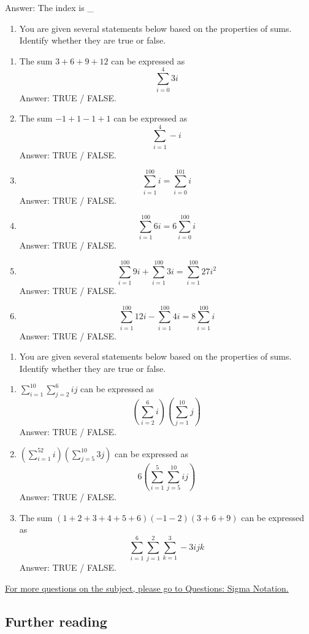 \documentclass[
  12pt,
  a4paper, oneside]{starmastarticle}
\providecommand{\tightlist}{%
  \setlength{\itemsep}{0pt}\setlength{\parskip}{0pt}}\usepackage{longtable,booktabs,array}
\begin{document}
Answer: The index is \_

\begin{enumerate}
\def\labelenumi{\arabic{enumi}.}
\setcounter{enumi}{2}
\tightlist
\item
  You are given several statements below based on the properties of
  sums. Identify whether they are true or false.
\end{enumerate}

\begin{enumerate}
\def\labelenumi{(\alph{enumi})}
\item
  The sum \(3 + 6 + 9 + 12\) can be expressed as \[\sum_{i = 0}^{4} 3i\]
  Answer: TRUE / FALSE.
\item
  The sum \(-1 + 1 - 1 + 1\) can be expressed as \[\sum_{i = 1}^{4} -i\]
  Answer: TRUE / FALSE.
\item
  \[\sum_{i = 1}^{100} i = \sum_{i = 0}^{101} i\] Answer: TRUE / FALSE.
\item
  \[\sum_{i = 1}^{100} 6i = 6 \sum_{i = 0}^{100} i\] Answer: TRUE /
  FALSE.
\item
  \[\sum_{i = 1}^{100} 9i + \sum_{i = 1}^{100} 3i = \sum_{i = 1}^{100} 27i^2\]
  Answer: TRUE / FALSE.
\item
  \[\sum_{i = 1}^{100} 12i - \sum_{i = 1}^{100} 4i = 8 \sum_{i = 1}^{100} i\]
  Answer: TRUE / FALSE.
\end{enumerate}

\begin{enumerate}
\def\labelenumi{\arabic{enumi}.}
\setcounter{enumi}{3}
\tightlist
\item
  You are given several statements below based on the properties of
  sums. Identify whether they are true or false.
\end{enumerate}

\begin{enumerate}
\def\labelenumi{(\alph{enumi})}
\item
  \(\sum_{i=1}^{10}\sum_{j=2}^6 ij\) can be expressed as
  \[(\sum_{i=2}^6i)(\sum_{j=1}^{10} j)\] Answer: TRUE / FALSE.
\item
  \((\sum_{i=1}^52i)(\sum_{j=5}^{10} 3j)\) can be expressed as
  \[6(\sum_{i=1}^5\sum_{j=5}^{10} ij)\] Answer: TRUE / FALSE.
\item
  The sum \((1+2+3+4+5+6)(-1-2)(3+6+9)\) can be expressed as
  \[\sum_{i=1}^6\sum_{j=1}^2\sum_{k=1}^3 -3ijk\] Answer: TRUE / FALSE.
\end{enumerate}

\href{qs-sigma-notation.qmd}{For more questions on the subject, please
go to Questions: Sigma Notation.}

\hypertarget{further-reading}{%
\subsection{Further reading}\label{further-reading}}
\end{document}
